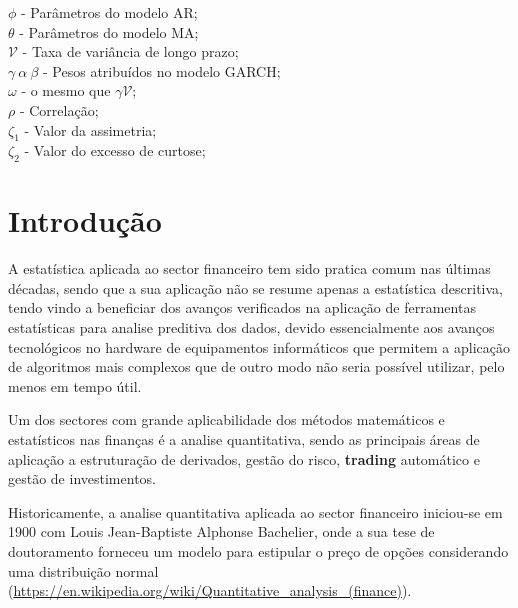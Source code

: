 \documentclass[
  12pt,
  a4paper,
  openany]{book}
\theoremstyle{definition}
\theoremstyle{definition}
\theoremstyle{definition}
\theoremstyle{remark}
\begin{document}
\(\phi\) - Parâmetros do modelo AR;\\

\(\theta\) - Parâmetros do modelo MA;\\

\(\mathcal{V}\) - Taxa de variância de longo prazo;\\

\(\gamma\ \alpha\ \beta\) - Pesos atribuídos no modelo GARCH;\\

\(\omega\) - o mesmo que \(\gamma\mathcal{V}\);\\

\(\rho\) - Correlação;\\

\(\zeta_1\) - Valor da assimetria;\\

\(\zeta_2\) - Valor do excesso de curtose;\\

\mainmatter

\hypertarget{intro}{%
\chapter*{Introdução}\label{intro}}

A estatística aplicada ao sector financeiro tem sido pratica comum nas últimas décadas, sendo que a sua aplicação não se resume apenas a estatística descritiva, tendo vindo a beneficiar dos avanços verificados na aplicação de ferramentas estatísticas para analise preditiva dos dados, devido essencialmente aos avanços tecnológicos no hardware de equipamentos informáticos que permitem a aplicação de algoritmos mais complexos que de outro modo não seria possível utilizar, pelo menos em tempo útil.

Um dos sectores com grande aplicabilidade dos métodos matemáticos e estatísticos nas finanças é a analise quantitativa, sendo as principais áreas de aplicação a estruturação de derivados, gestão do risco, \textbf{trading} automático e gestão de investimentos.

Historicamente, a analise quantitativa aplicada ao sector financeiro iniciou-se em 1900 com Louis Jean-Baptiste Alphonse Bachelier, onde a sua tese de doutoramento forneceu um modelo para estipular o preço de opções considerando uma distribuição normal (\url{https://en.wikipedia.org/wiki/Quantitative_analysis_(finance)}).
\end{document}
